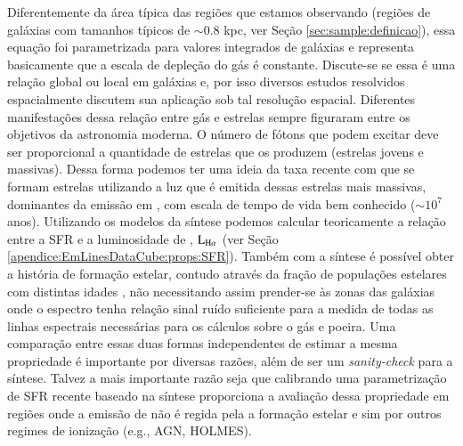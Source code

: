 Diferentemente da área típica das regiões que estamos observando (regiões de galáxias com tamanhos típicos de $\sim 0.8 $ kpc, ver Seção \ref{sec:sample:definicao}), essa equação foi parametrizada para valores integrados de galáxias e representa basicamente que a escala de depleção do gás é constante. Discute-se se essa é uma relação global \citep{Bigiel.etal.2008a, Blanc.etal.2009, Leroy.etal.2013a} ou local \citep[e.g., dependente da densidade superficial de gás; ][]{Kennicutt.etal.2007a, Liu.etal.2011a, Calzetti.etal.2012a, Shetty.etal.2013} em galáxias e, por isso diversos estudos resolvidos espacialmente discutem sua aplicação sob tal resolução espacial. Diferentes manifestações dessa relação entre gás e estrelas sempre figuraram entre os objetivos da astronomia moderna. O número de fótons que podem excitar \Ha deve ser proporcional a quantidade de estrelas que os produzem (estrelas jovens e massivas). Dessa forma podemos ter uma ideia da taxa recente com que se formam estrelas utilizando a luz que é emitida dessas estrelas mais massivas, dominantes da emissão em \Ha, com escala de tempo de vida bem conhecido ($\sim 10^7$ anos). Utilizando os modelos da síntese podemos calcular teoricamente a relação entre a SFR e a luminosidade de \Ha, $\LHalpha$ (ver Seção \ref{apendice:EmLinesDataCube:props:SFR}). Também com a síntese é possível obter a história de formação estelar, contudo através da fração de populações estelares com distintas idades \citep{Asari.etal.2007a}, não necessitando assim prender-se às zonas das galáxias onde o espectro tenha relação sinal ruído suficiente para a medida de todas as linhas espectrais necessárias para os cálculos sobre o gás e poeira. Uma comparação entre essas duas formas independentes de estimar a mesma propriedade é importante por diversas razões, além de ser um {\em sanity-check} para a síntese. Talvez a mais importante razão seja que calibrando uma parametrização de SFR recente baseado na síntese proporciona a avaliação dessa propriedade em regiões onde a emissão de \Ha não é regida pela a formação estelar e sim por outros regimes de ionização (e.g., AGN, HOLMES).

